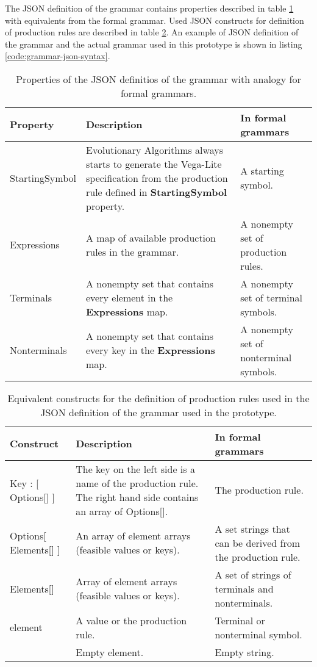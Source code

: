 The JSON definition of the grammar contains properties described in table \ref{table:properties-of-grammar} with equivalents from the formal grammar. Used JSON constructs for definition of production rules are described in table \ref{table:production-rules-of-grammar}.
An example of JSON definition of the grammar and the actual grammar used in this prototype is shown in listing \ref{code:grammar-json-syntax}.
\begin{table}[htbp]
  \centering
  \caption{Properties of the JSON definitios of the grammar with analogy for formal grammars.}
  \label{table:properties-of-grammar}
      \begin{tabular}{ m{6em} m{13em} m{10em} }
      \toprule
          \textbf{Property} & \textbf{Description} & \textbf{In formal grammars} \\
      \toprule
\hline StartingSymbol & Evolutionary Algorithms always starts to generate the Vega-Lite specification from the production rule defined in \textbf{StartingSymbol} property. & A starting symbol. \\
\hline Expressions & A map of available production rules in the grammar. & A nonempty set of production rules. \\
\hline Terminals & A nonempty set that contains every element in the \textbf{Expressions} map. & A nonempty set of terminal symbols. \\
\hline Nonterminals & A nonempty set that contains every key in the \textbf{Expressions} map. & A nonempty set of nonterminal symbols. \\
\hline
    \end{tabular}
\end{table}

\begin{table}[htbp]
  \centering
  \caption{Equivalent constructs for the definition of production rules used in the JSON definition of the grammar used in the prototype.}
  \label{table:production-rules-of-grammar}
      \begin{tabular}{ m{9em} m{10em} m{9em} }
      \toprule
          \textbf{Construct} & \textbf{Description} & \textbf{In formal grammars} \\
      \toprule
\hline Key : [ Options[] ] & The key on the left side is a name of the production rule. The right hand side contains an array of Options[]. & The production rule. \\
\hline Options[ Elements[] ] & An array of element arrays (feasible values or keys). & A set strings that can be derived from the production rule. \\
\hline Elements[] & Array of element arrays (feasible values or keys). & A set of strings of terminals and nonterminals. \\
\hline element & A value or the production rule.  & Terminal or nonterminal symbol. \\
\hline [] & Empty element. & Empty string. \\
          \end{tabular}
      \end{table}

